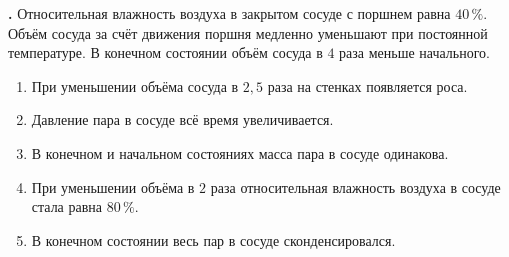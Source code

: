 \documentclass[12pt,a4paper]{article}
\newif\ifShowSolutions
\newcounter{banktask}
\newcommand{\BankTask}[3]{%
  \refstepcounter{banktask}%
  \Needspace{35mm}\par\medskip\noindent\begin{minipage}{\linewidth}%
  \noindent\textbf{\thebanktask.}\quad #2\par
  \ifShowSolutions
    #3\par
    \ifdefined\TutorEdition
      \ifcsname TutorSource#1\endcsname
        \smallskip{\small\csname TutorSource#1\endcsname\par}%
      \fi
    \fi
  \fi
  \end{minipage}\par\medskip
}
\begin{document}
\BankTask{430072}{
Относительная влажность воздуха в закрытом сосуде с поршнем равна \(40\,\%\). Объём сосуда за счёт движения поршня медленно уменьшают при постоянной температуре. В конечном состоянии объём сосуда в \(4\) раза меньше начального.
\begin{enumerate}
\item При уменьшении объёма сосуда в \(2{,}5\) раза на стенках появляется роса.
\item Давление пара в сосуде всё время увеличивается.
\item В конечном и начальном состояниях масса пара в сосуде одинакова.
\item При уменьшении объёма в \(2\) раза относительная влажность воздуха в сосуде стала равна \(80\,\%\).
\item В конечном состоянии весь пар в сосуде сконденсировался.
\end{enumerate}
}{
\smallskip\noindent\textbf{Решение от GPT}\par
При постоянной температуре давление насыщенного пара \(p_{\text{нас}}\) постоянно. До насыщения \(pV=\mathrm{const}\), поэтому \(\varphi=0{,}4V_0/V\).
\begin{enumerate}
\item Верно: насыщение достигается при \(V=0{,}4V_0=V_0/2{,}5\); начинается выпадение росы.
\item Неверно: после насыщения давление пара остаётся равным \(p_{\text{нас}}\).
\item Неверно: часть пара конденсируется. При \(V_f=V_0/4\) отношение масс пара равно \(m_f/m_0=(1/4)/0{,}4=0{,}625\).
\item Верно: при \(V=V_0/2\) влажность \(\varphi=0{,}8=80\,\%\).
\item Неверно: в конечном состоянии остаётся насыщенный пар.
\end{enumerate}
Ответ: \(14\).
}
\end{document}
